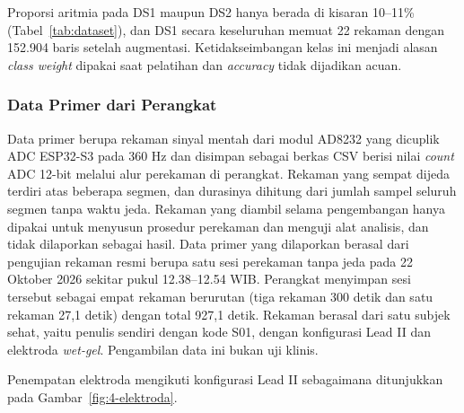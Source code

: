 Proporsi aritmia pada DS1 maupun DS2 hanya berada di kisaran 10--11\% (Tabel~\ref{tab:dataset}), dan DS1 secara keseluruhan memuat 22 rekaman dengan 152.904 baris setelah augmentasi. Ketidakseimbangan kelas ini menjadi alasan \textit{class weight} dipakai saat pelatihan dan \textit{accuracy} tidak dijadikan acuan.

\subsubsection{Data Primer dari Perangkat}

Data primer berupa rekaman sinyal mentah dari modul AD8232 yang dicuplik ADC ESP32-S3 pada 360 Hz dan disimpan sebagai berkas CSV berisi nilai \textit{count} ADC 12-bit melalui alur perekaman di perangkat. Rekaman yang sempat dijeda terdiri atas beberapa segmen, dan durasinya dihitung dari jumlah sampel seluruh segmen tanpa waktu jeda. Rekaman yang diambil selama pengembangan hanya dipakai untuk menyusun prosedur perekaman dan menguji alat analisis, dan tidak dilaporkan sebagai hasil. Data primer yang dilaporkan berasal dari pengujian rekaman resmi berupa satu sesi perekaman tanpa jeda pada 22 Oktober 2026 sekitar pukul 12.38--12.54 WIB. Perangkat menyimpan sesi tersebut sebagai empat rekaman berurutan (tiga rekaman 300 detik dan satu rekaman 27,1 detik) dengan total 927,1 detik. Rekaman berasal dari satu subjek sehat, yaitu penulis sendiri dengan kode S01, dengan konfigurasi Lead II dan elektroda \textit{wet-gel}. Pengambilan data ini bukan uji klinis.

Penempatan elektroda mengikuti konfigurasi Lead II sebagaimana ditunjukkan pada Gambar~\ref{fig:4-elektroda}.

